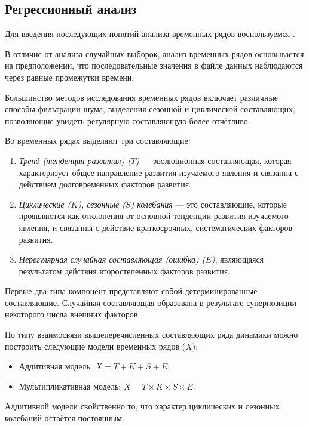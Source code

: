 
\subsection{Регрессионный анализ} %
\label{sec:regr_analysis}

Для введения последующих понятий анализа временных рядов воспользуемся \cite{Eddows1997}.

В отличие от анализа случайных выборок, анализ временных рядов основывается на предположении, что последовательные значения в файле данных наблюдаются через равные промежутки времени.

Большинство методов исследования временных рядов включает различные способы фильтрации шума, выделения сезонной и циклической составляющих, позволяющие увидеть регулярную составляющую более отчётливо.

Во временных рядах выделяют три составляющие:
\begin{enumerate}
	\item \textit{Тренд (тенденция развития) ($T$)} --- эволюционная составляющая, которая характеризует общее направление развития изучаемого явления и связанна с действием долговременных факторов развития.
	\item \textit{Циклические ($K$), сезонные ($S$) колебания} --- это составляющие, которые проявляются как отклонения от основной тенденции развития изучаемого явления, и связанны с действие краткосрочных, систематических факторов развития.
	\item \textit{Нерегулярная случайная составляющая (ошибка) ($E$)}, являющаяся результатом действия второстепенных факторов развития.
\end{enumerate}
Первые два типа компонент представляют собой детерминированные составляющие. Случайная составляющая образована в результате суперпозиции некоторого числа внешних факторов.

По типу взаимосвязи вышеперечисленных составляющих ряда динамики можно построить следующие модели временных рядов ($X$):

\begin{itemize}
	\item Аддитивная модель: $X = T + K + S + E$;
	\item Мультипликативная модель: $X = T \times K \times S \times E$.
\end{itemize}
Аддитивной модели свойственно то, что характер циклических и сезонных колебаний остаётся постоянным.

